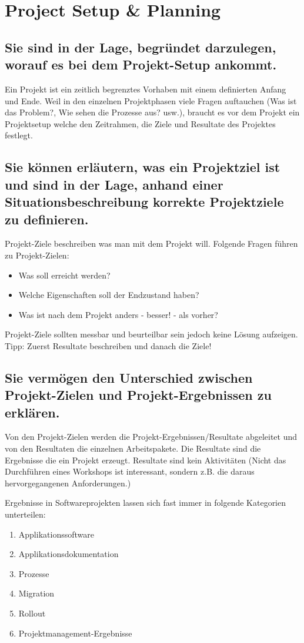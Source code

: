 \chapter{Project Setup \& Planning}

\section{Sie sind in der Lage, begründet darzulegen, worauf es bei dem Projekt-Setup ankommt.}

Ein Projekt ist ein zeitlich begrenztes Vorhaben mit einem definierten Anfang und Ende. Weil in den einzelnen Projektphasen viele Fragen auftauchen (Was ist das Problem?, Wie sehen die Prozesse aus? usw.), braucht es vor dem Projekt ein Projektsetup welche den Zeitrahmen, die Ziele und Resultate des Projektes festlegt.

\section{Sie können erläutern, was ein Projektziel ist und sind in der Lage, anhand einer Situationsbeschreibung korrekte Projektziele zu definieren.}

Projekt-Ziele beschreiben was man mit dem Projekt will. Folgende Fragen führen zu Projekt-Zielen:
\begin{itemize}
	\item Was soll erreicht werden?
	\item Welche Eigenschaften soll der Endzustand haben?
	\item Was ist nach dem Projekt anders - besser! - als vorher?
\end{itemize}
Projekt-Ziele sollten messbar und beurteilbar sein jedoch keine Lösung aufzeigen. Tipp: Zuerst Resultate beschreiben und danach die Ziele!

\section{Sie vermögen den Unterschied zwischen Projekt-Zielen und Projekt-Ergebnissen zu erklären.}

Von den Projekt-Zielen werden die Projekt-Ergebnissen/Resultate abgeleitet und von den Resultaten die einzelnen Arbeitspakete. Die Resultate sind die Ergebnisse die ein Projekt erzeugt. Resultate sind kein Aktivitäten (Nicht das Durchführen eines Workshops ist interessant, sondern z.B. die daraus hervorgegangenen Anforderungen.)

Ergebnisse in Softwareprojekten lassen sich fast immer in folgende Kategorien unterteilen:

\begin{enumerate}
	\item Applikationssoftware
	\item Applikationsdokumentation
	\item Prozesse
	\item Migration
	\item Rollout
	\item Projektmanagement-Ergebnisse
\end{enumerate}